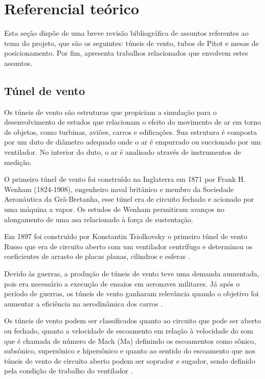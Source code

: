 \chapter{Referencial teórico}\label{ch:referencial}

Esta seção dispõe de uma breve revisão bibliográfica de assuntos referentes ao tema do projeto, que são 
os seguintes: túneis de vento, tubos de Pitot e mesas de posicionamento. Por fim, apresenta trabalhos 
relacionados que envolvem estes assuntos.

\section{Túnel de vento}\label{sec:tunel}

Os túneis de vento são estruturas que propiciam a simulação para o desenvolvimento de estudos que relacionam 
o efeito do movimento de ar em torno de objetos, como turbinas, aviões, carros e edificações. Sua estrutura 
é composta por um duto de diâmetro adequado onde o ar é empurrado ou succionado por um ventilador. No 
interior do duto, o ar é analisado através de instrumentos de medição.

O primeiro túnel de vento foi construído na Inglaterra em 1871 por Frank H. Wenham (1824-1908), engenheiro 
naval britânico e membro da Sociedade Aeronáutica da Grã-Bretanha, esse túnel era de circuito fechado e 
acionado por uma máquina a vapor. Os estudos de Wenham permitiram avanços no alongamento de uma asa 
relacionado à força de sustentação\cite{carminatti2019desenvolvimento}.

Em 1897 foi construído por Konstantin Tsiolkovsky o primeiro túnel de vento Russo que era de circuito 
aberto com um ventilador centrífugo e determinou os coeficientes de arrasto de placas planas, cilindros 
e esferas \cite{joglekar2014design}. 

Devido às guerras, a produção de túneis de vento teve uma demanda aumentada, pois era necessário a execução 
de ensaios em aeronaves militares. Já após o período de guerras, os túneis de vento ganharam relevância 
quando o objetivo foi aumentar a eficiência na aerodinâmica dos carros \cite{de2014adalberto}. 

Os túneis de vento podem ser classificados  quanto ao circuito que pode ser aberto ou fechado,  quanto a velocidade 
de escoamento em relação à velocidade do som que é chamada de  número de Mach (Ma) definindo os escoamentos como sônico, 
subsônico, supersônico e hipersônico e quanto ao sentido do escoamento que nos túneis de vento de circuito aberto podem 
ser soprador e sugador, sendo definido pela condição de trabalho do  ventilador \cite{pritchard2005fox}.


